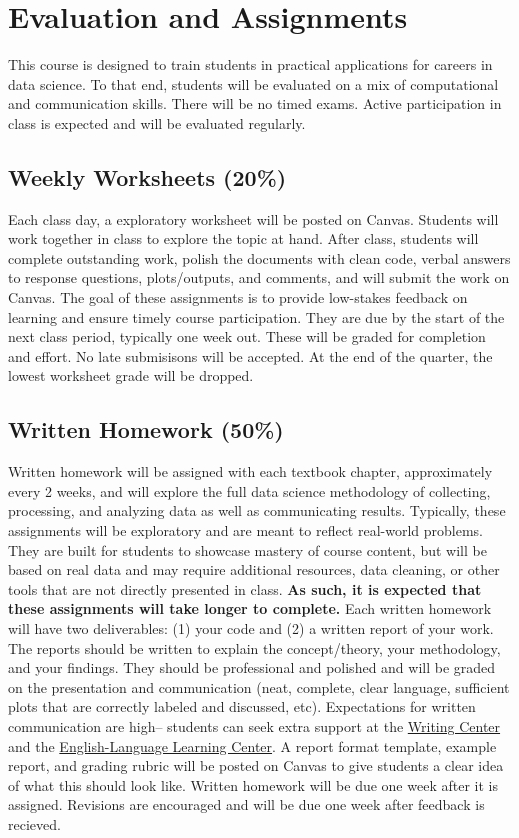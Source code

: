 \documentclass[16pt]{article}
\begin{document}
	\section*{Evaluation and Assignments}	
	This course is designed to train students in practical applications for careers in data science. To that end, students will be evaluated on a mix of computational and communication skills. There will be no timed exams. Active participation in class is expected and will be evaluated regularly. 
	
	\subsection*{Weekly Worksheets (20\%)}  Each class day, a exploratory worksheet will be posted on Canvas. Students will work together in class to explore the topic at hand. After class, students will complete outstanding work, polish the documents with clean code, verbal answers to response questions, plots/outputs, and comments, and will submit the work on Canvas. The goal of these assignments is to provide low-stakes feedback on learning and ensure timely course participation. They are due by the start of the next class period, typically one week out. These will be graded for completion and effort. No late submisisons will be accepted. At the end of the quarter, the lowest worksheet grade will be dropped. 
	
	\subsection*{Written Homework (50\%)} Written homework will be assigned with each textbook chapter, approximately every 2 weeks, and will explore the full data science methodology of collecting, processing, and analyzing data as well as communicating results. Typically, these assignments will be exploratory and are meant to reflect real-world problems. They are built for students to showcase mastery of course content, but will be based on real data and may require additional resources, data cleaning, or other tools that are not directly presented in class.\textbf{ As such, it is expected that these assignments will take longer to complete.} Each written homework will have two deliverables: (1) your code and (2) a written report of your work. The reports should be written to explain the concept/theory, your methodology, and your findings. They should be professional and polished and will be graded on the presentation and communication (neat, complete, clear language, sufficient plots that are correctly labeled and discussed, etc). Expectations for written communication are high-- students can seek extra support at the \href{https://www.seattleu.edu/writingcenter/}{Writing Center} and the \href{https://www.seattleu.edu/ellc/ellc-tutoring/}{English-Language Learning Center}. A report format template, example report, and grading rubric will be posted on Canvas to give students a clear idea of what this should look like. Written homework will be due one week after it is assigned. Revisions are encouraged and will be due one week after feedback is recieved. 
	
\end{document}
